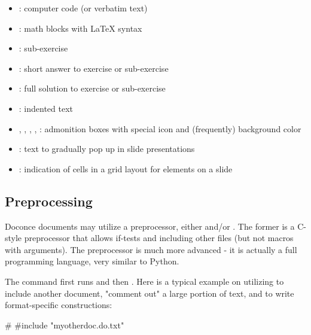 \documentclass[%
oneside,                 %
final,                   %
10pt]{article}
\begin{document}
\begin{itemize}
 \item {}: computer code (or verbatim text)

 \item {}: math blocks with {\LaTeX} syntax

 \item {}: sub-exercise

 \item {}: short answer to exercise or sub-exercise

 \item {}: full solution to exercise or sub-exercise

 \item {}: indented text

 \item {}, , , , : admonition boxes with
    special icon and (frequently) background color

 \item {}: text to gradually pop up in slide presentations

 \item {}: indication of cells in a grid layout for elements on a
   slide
\end{itemize}

\noindent
\subsection{Preprocessing}

Doconce documents may utilize a preprocessor, either  and/or
. The former is a C-style preprocessor that allows if-tests
and including other files (but not macros with arguments).
The  preprocessor is much more advanced - it is actually a full
programming language, very similar to Python.

The command  first runs  and then .
Here is a typical example on utilizing  to include another
document, "comment out" a large portion of text, and to write format-specific
constructions:

\bccq
# #include "myotherdoc.do.txt"
\end{document}
